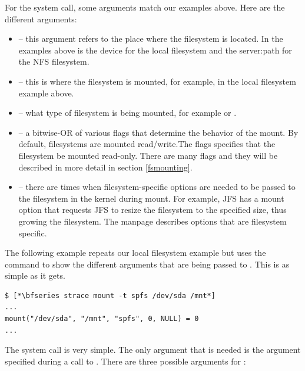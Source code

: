 \noindent
For the  system call, some arguments match our examples above. Here are the different arguments:

\begin{itemize}
	\item {} -- this argument refers to the place where the filesystem is located. In the examples above  is
		the device  for the local filesystem and the server:path  for the NFS 
		filesystem.
	\item {} -- this is where the filesystem is mounted, for example,  in the local filesystem example above.
	\item {} -- what type of filesystem is being mounted, for example  or .
	\item {} -- a bitwise-OR of various flags that determine the behavior of the mount. By default, filesystems
		are mounted read/write.The  flags specifies that the filesystem be mounted read-only. There are
		many flags and they will be described in more detail in section \ref{fsmounting}.
	\item {} -- there are times when filesystem-specific options are needed to be passed to the filesystem in the
		kernel during mount. For example, JFS has a  mount option that requests JFS to resize the filesystem
		to the specified size, thus growing the filesystem. The  manpage describes options that are 
		filesystem specific.
\end{itemize}

\noindent
The following example repeats our local filesystem example but uses the  command to show the different arguments that are being passed to . This is as simple as it gets.

\begin{lstlisting}
$ [*\bfseries strace mount -t spfs /dev/sda /mnt*]
...
mount("/dev/sda", "/mnt", "spfs", 0, NULL) = 0
...
\end{lstlisting}

\noindent
The  system call is very simple. The only argument that is needed is the  argument specified during a call to . There are three possible arguments for :

